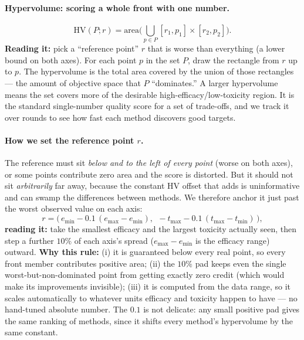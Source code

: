 \documentclass[11pt]{article}
\begin{document}
\paragraph{Hypervolume: scoring a whole front with one number.}
\begin{equation}
\mathrm{HV}(P;r)=\text{area}\Big(\bigcup_{p\in P}[r_1,p_1]\times[r_2,p_2]\Big).
\end{equation}
\textbf{Reading it:} pick a ``reference point'' $r$ that is worse than everything (a lower
bound on both axes). For each point $p$ in the set $P$, draw the rectangle from $r$ up to
$p$. The hypervolume is the total area covered by the union of those rectangles --- the
amount of objective space that $P$ ``dominates.'' A larger hypervolume means the set covers
more of the desirable high-efficacy/low-toxicity region. It is the standard single-number
quality score for a set of trade-offs, and we track it over rounds to see how fast each
method discovers good targets.

\paragraph{How we set the reference point $r$.} The reference must sit \emph{below and to
the left of every point} (worse on both axes), or some points contribute zero area and the
score is distorted. But it should not sit \emph{arbitrarily} far away, because the constant
$\mathrm{HV}$ offset that adds is uninformative and can swamp the differences between
methods. We therefore anchor it just past the worst observed value on each axis:
\begin{equation}
r=\Big(\,e_{\min}-0.1\,(e_{\max}-e_{\min}),\ \ -t_{\max}-0.1\,(t_{\max}-t_{\min})\,\Big),
\end{equation}
\textbf{reading it:} take the smallest efficacy and the largest toxicity actually seen,
then step a further $10\%$ of each axis's spread ($e_{\max}-e_{\min}$ is the efficacy range)
outward. \textbf{Why this rule:} (i) it is guaranteed below every real point, so every
front member contributes positive area; (ii) the $10\%$ pad keeps even the single
worst-but-non-dominated point from getting exactly zero credit (which would make its
improvements invisible); (iii) it is computed from the data range, so it scales
automatically to whatever units efficacy and toxicity happen to have --- no hand-tuned
absolute number. The $0.1$ is not delicate: any small positive pad gives the same ranking
of methods, since it shifts every method's hypervolume by the same constant.
\end{document}
